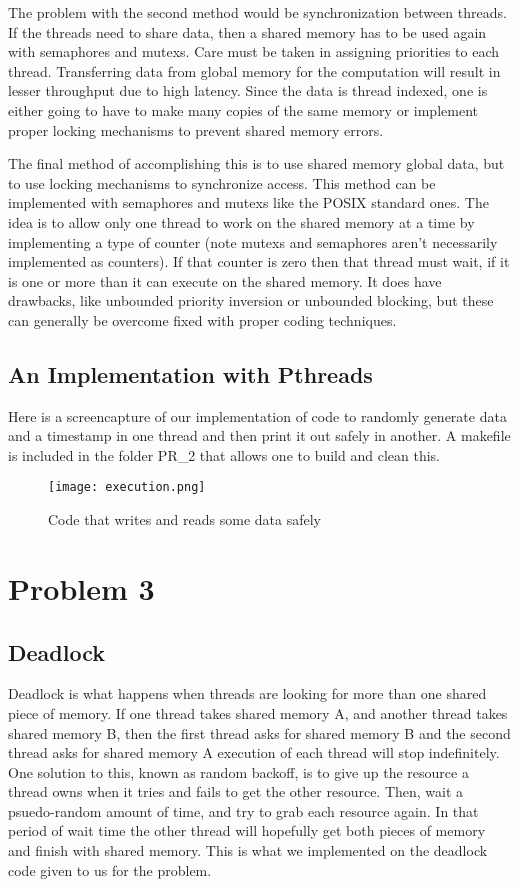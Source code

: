\documentclass{article}
\begin{document}
The problem with the second method would be synchronization between threads. If the threads need to share data, then a shared memory has to be used again with semaphores and mutexs. Care must be taken in assigning priorities to each thread. Transferring data from global memory for the computation will result in lesser throughput due to high latency. Since the data is thread indexed, one is either going to have to make many copies of the same memory or implement proper locking mechanisms to prevent shared memory errors.

The final method of accomplishing this is to use shared memory global data, but to use locking mechanisms to synchronize access. This method can be implemented with semaphores and mutexs like the POSIX standard ones. The idea is to allow only one thread to work on the shared memory at a time by implementing a type of counter (note mutexs and semaphores aren't necessarily implemented as counters). If that counter is zero then that thread must wait, if it is one or more than it can execute on the shared memory. It does have drawbacks, like unbounded priority inversion or unbounded blocking, but these can generally be overcome fixed with proper coding techniques.

\subsection*{An Implementation with Pthreads}
Here is a screencapture of our implementation of code to randomly generate data and a timestamp in one thread and then print it out safely in another. A makefile is included in the folder PR\_2 that allows one to build and clean this.
\begin{figure}[H]
    \centering
    \texttt{[image: execution.png]}
    \caption{Code that writes and reads some data safely}
\end{figure}
\section*{Problem 3}
\subsection*{Deadlock}
Deadlock is what happens when threads are looking for more than one shared piece of memory. If one thread takes shared memory A, and another thread takes shared memory B, then the first thread asks for shared memory B and the second thread asks for shared memory A execution of each thread will stop indefinitely. One solution to this, known as random backoff, is to give up the resource a thread owns when it tries and fails to get the other resource. Then, wait a psuedo-random amount of time, and try to grab each resource again. In that period of wait time the other thread will hopefully get both pieces of memory and finish with shared memory. This is what we implemented on the deadlock code given to us for the problem.
\end{document}

